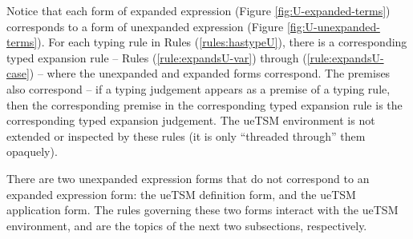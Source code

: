 Notice that each form of expanded expression (Figure \ref{fig:U-expanded-terms}) corresponds to a form of unexpanded expression (Figure \ref{fig:U-unexpanded-terms}). For each typing rule in Rules (\ref{rules:hastypeU}), there is a corresponding typed expansion rule -- Rules (\ref{rule:expandsU-var}) through (\ref{rule:expandsU-case}) -- where the unexpanded and expanded forms correspond. The premises also correspond -- if a typing judgement appears as a premise of a typing rule, then the corresponding premise in the corresponding typed expansion rule is the corresponding typed expansion judgement. The ueTSM environment is not extended or inspected by these rules (it is only ``threaded through'' them opaquely).

There are two unexpanded expression forms that do not correspond to an expanded expression form: the ueTSM definition form, and the ueTSM application form. The rules governing these two forms interact with the ueTSM environment, and are the topics of the next two subsections, respectively.

